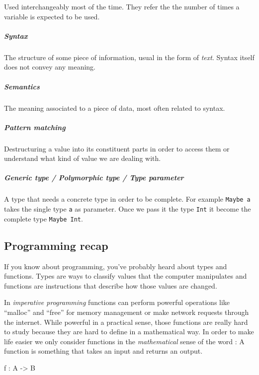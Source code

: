 \documentclass[
]{article}
\newenvironment{Shaded}{}{}
\newcommand{\DataTypeTok}[1]{\textcolor[rgb]{0.56,0.13,0.00}{#1}}
\newcommand{\NormalTok}[1]{#1}
\newcommand{\OperatorTok}[1]{\textcolor[rgb]{0.40,0.40,0.40}{#1}}
\newcommand{\OtherTok}[1]{\textcolor[rgb]{0.00,0.44,0.13}{#1}}
\begin{document}
Used interchangeably most of the time. They refer the the number of
times a variable is expected to be used.

\hypertarget{syntax}{%
\subparagraph{Syntax}\label{syntax}}

The structure of some piece of information, usual in the form of
\emph{text}. Syntax itself does not convey any meaning.

\hypertarget{semantics}{%
\subparagraph{Semantics}\label{semantics}}

The meaning associated to a piece of data, most often related to syntax.

\hypertarget{pattern-matching}{%
\subparagraph{Pattern matching}\label{pattern-matching}}

Destructuring a value into its constituent parts in order to access them
or understand what kind of value we are dealing with.

\hypertarget{generic-type-polymorphic-type-type-parameter}{%
\subparagraph{Generic type / Polymorphic type / Type
parameter}\label{generic-type-polymorphic-type-type-parameter}}

A type that needs a concrete type in order to be complete. For example
\texttt{Maybe\ a} takes the single type \texttt{a} as parameter. Once we
pass it the type \texttt{Int} it become the complete type
\texttt{Maybe\ Int}.

\hypertarget{programming-recap}{%
\subsection{Programming recap}\label{programming-recap}}

If you know about programming, you've probably heard about types and
functions. Types are ways to classify values that the computer
manipulates and functions are instructions that describe how those
values are changed.

In \emph{imperative programming} functions can perform powerful
operations like ``malloc'' and ``free'' for memory management or make
network requests through the internet. While powerful in a practical
sense, those functions are really hard to study because they are hard to
define in a mathematical way. In order to make life easier we only
consider functions in the \emph{mathematical} sense of the word : A
function is something that takes an input and returns an output.

\begin{Shaded}
\begin{Highlighting}[]
\NormalTok{f }\OperatorTok{:} \DataTypeTok{A} \OtherTok{{-}\textgreater{}} \DataTypeTok{B}
\end{Highlighting}
\end{Shaded}
\end{document}
